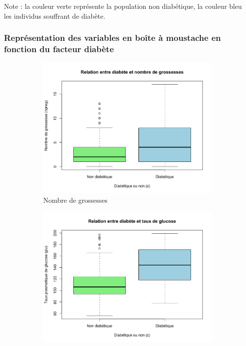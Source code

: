 \documentclass[a4paper,11pt]{report}
\begin{document}
Note : la couleur verte représente la population non diabétique, la couleur bleu les individus souffrant de diabète. 

\subsubsection{Représentation des variables en boîte à moustache en fonction du facteur diabète}

\begin{figure}[H]
	\centering
	\captionsetup{justification=centering, margin=2cm}
	\begin{subfigure}[b]{0.25\linewidth}
		\centering
		\captionsetup{justification=centering}
		\includegraphics[width=1\linewidth]{img/1-3-2-boxplot-diabete-grossesses}
		\caption{\scriptsize Nombre de grossesses}
		\label{fig:1-3-2-boxplot-diabete-grossesses}
	\end{subfigure}%
	\begin{subfigure}[b]{0.25\linewidth}
		\centering
		\captionsetup{justification=centering}
		\includegraphics[width=1\linewidth]{img/1-3-2-boxplot-diabete-glucose}

\end{subfigure}
\end{figure}
\end{document}
